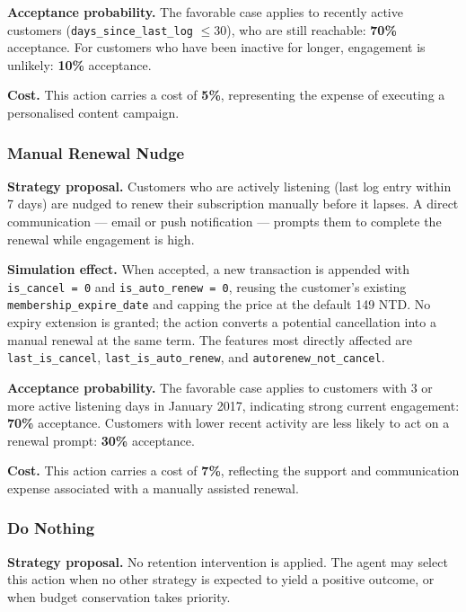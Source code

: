 \documentclass{article}
\begin{document}
\textbf{Acceptance probability.}
The favorable case applies to recently active customers (\texttt{days\_since\_last\_log}
$\leq 30$), who are still reachable: \textbf{70\%} acceptance. For customers who have been
inactive for longer, engagement is unlikely: \textbf{10\%} acceptance.

\textbf{Cost.}
This action carries a cost of \textbf{5\%}, representing the expense of executing a
personalised content campaign.


\subsubsection{Manual Renewal Nudge}

\textbf{Strategy proposal.}
Customers who are actively listening (last log entry within 7 days) are nudged to renew their
subscription manually before it lapses. A direct communication — email or push notification —
prompts them to complete the renewal while engagement is high.

\textbf{Simulation effect.}
When accepted, a new transaction is appended with \texttt{is\_cancel = 0} and
\texttt{is\_auto\_renew = 0}, reusing the customer's existing
\texttt{membership\_expire\_date} and capping the price at the default 149 NTD. No expiry
extension is granted; the action converts a potential cancellation into a manual renewal
at the same term. The features most directly affected are \texttt{last\_is\_cancel},
\texttt{last\_is\_auto\_renew}, and \texttt{autorenew\_not\_cancel}.

\textbf{Acceptance probability.}
The favorable case applies to customers with 3 or more active listening days in January 2017,
indicating strong current engagement: \textbf{70\%} acceptance. Customers with lower recent
activity are less likely to act on a renewal prompt: \textbf{30\%} acceptance.

\textbf{Cost.}
This action carries a cost of \textbf{7\%}, reflecting the support and communication expense
associated with a manually assisted renewal.


\subsubsection{Do Nothing}

\textbf{Strategy proposal.}
No retention intervention is applied. The agent may select this action when no other strategy
is expected to yield a positive outcome, or when budget conservation takes priority.
\end{document}
